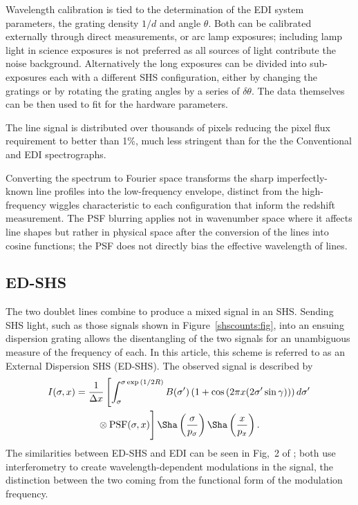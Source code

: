 \documentclass[preprint2, 10pt]{aastex}
\begin{document}
Wavelength calibration is tied to the determination of the EDI system parameters, the grating density $1/d$ and angle $\theta$.
Both can be calibrated externally through direct measurements, or arc lamp exposures; including lamp light
in science exposures is not preferred as all sources of light contribute the noise background.
Alternatively
the long exposures can be divided into sub-exposures each with a different SHS configuration, either by changing the
gratings or by rotating the grating angles by a series of $\delta \theta$.  The data themselves can be then used to fit for
the hardware parameters.

The line signal is distributed over thousands of pixels reducing the pixel flux requirement to better than 1\%, much less stringent
than for the the Conventional and EDI spectrographs.

Converting the spectrum to Fourier space transforms the sharp imperfectly-known line profiles into the low-frequency envelope,
distinct from the high-frequency wiggles characteristic to each configuration that inform the redshift measurement.
The PSF blurring applies not in wavenumber space where it affects
line shapes but rather in physical space after the conversion of the lines into cosine functions; the PSF does not directly bias the effective
wavelength of lines.

\subsection{ED-SHS}
The two doublet lines combine to produce a mixed signal in an SHS.  Sending SHS light, such as those signals shown
in  Figure~\ref{shscounts:fig}, into an ensuing dispersion grating
allows the disentangling of the two signals for an unambiguous measure of the frequency of each.  In this article,
this scheme is 
referred to as an External Dispersion SHS (ED-SHS).
The observed signal is described by
\begin{align}
I(\sigma,x) &= \frac{1}{\Delta x}\left[\int^{\sigma \exp{\left(1/2R\right)}}_{\sigma} B(\sigma')\left(1+\cos{\left(2 \pi x (2\sigma' \sin{\gamma})\right)}\right)d\sigma'   \right. \nonumber \\
& \qquad \left.\vphantom{\int^{\sigma \exp{\left(1/2R\right)}}_{\sigma} } \otimes \mbox{PSF}(\sigma,x)\right]\Sha\left(\frac{\sigma}{p_\sigma}\right) \Sha\left(\frac{x}{p_x}\right).
\label{edishssig:eqn}
\end{align}
The similarities between ED-SHS and EDI can be seen in Fig,\ 2 of \citet{2003PASP..115..255E}; both use
interferometry to create wavelength-dependent modulations in the signal, the distinction between the two coming
from the functional form of
the modulation frequency.
\end{document}
